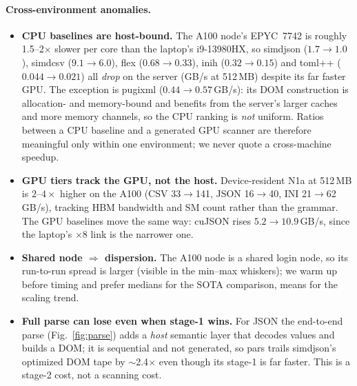 \paragraph{Cross-environment anomalies.}
\begin{itemize}
  \item \textbf{CPU baselines are host-bound.}  The A100 node's EPYC~7742 is
        roughly 1.5--2$\times$ slower per core than the laptop's i9-13980HX, so
        \textsf{simdjson} ($1.7\to1.0$), \textsf{simdcsv} ($9.1\to6.0$),
        \textsf{flex} ($0.68\to0.33$), \textsf{inih} ($0.32\to0.15$) and
        \textsf{toml++} ($0.044\to0.021$) all \emph{drop} on the server
        (GB/s at 512\,MB) despite its far faster GPU.  The exception is
        \textsf{pugixml} ($0.44\to0.57$\,GB/s): its DOM construction is
        allocation- and memory-bound and benefits from the server's larger
        caches and more memory channels, so the CPU ranking is \emph{not}
        uniform.  Ratios between a CPU baseline and a generated GPU scanner are
        therefore meaningful only within one environment; we never quote a
        cross-machine speedup.
  \item \textbf{GPU tiers track the GPU, not the host.}  Device-resident N1a at
        512\,MB is $2$--$4\times$ higher on the A100 (CSV 33$\to$141, JSON
        16$\to$40, INI 21$\to$62\,GB/s), tracking HBM bandwidth and SM count
        rather than the grammar.  The GPU baselines move the same way:
        \textsf{cuJSON} rises $5.2\to10.9$\,GB/s, since the laptop's
        $\times$8 link is the narrower one.
  \item \textbf{Shared node $\Rightarrow$ dispersion.}  The A100 node is a
        shared login node, so its run-to-run spread is larger (visible in the
        min--max whiskers); we warm up before timing and prefer medians for the
        SOTA comparison, means for the scaling trend.
  \item \textbf{Full parse can lose even when stage-1 wins.}  For JSON the
        end-to-end parse (Fig.~\ref{fig:parse}) adds a \emph{host} semantic
        layer that decodes values and builds a DOM; it is sequential and not
        generated, so pars trails \textsf{simdjson}'s optimized DOM tape by
        $\sim$2.4$\times$ even though its stage-1 is far faster.  This is a
        stage-2 cost, not a scanning cost.
\end{itemize}

